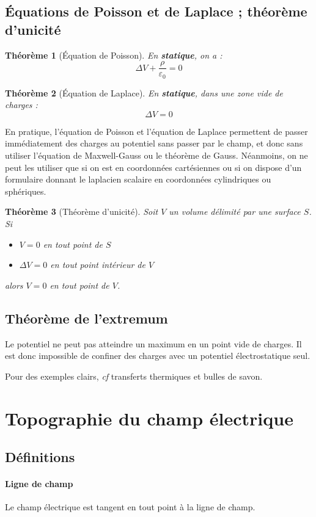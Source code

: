 \documentclass[french]{book}
\theoremstyle{plain}
\newtheorem{thm}{Théorème}
\theoremstyle{definition}
\theoremstyle{remark}
\begin{document}
\subsection{Équations de Poisson et de Laplace ; théorème d'unicité}
\begin{thm}[Équation de Poisson]
	En \textbf{statique}, on a : $$\Delta V+\frac{\rho}{\varepsilon_0}=0$$
\end{thm}
\begin{thm}[Équation de Laplace]
	En \textbf{statique}, dans une zone vide de charges : $$\Delta V=0$$
\end{thm}
En pratique, l'équation de Poisson et l'équation de Laplace permettent de passer immédiatement des charges au potentiel sans passer par le champ, et donc sans utiliser l'équation de Maxwell-Gauss ou le théorème de Gauss. Néanmoins, on ne peut les utiliser que si on est en coordonnées cartésiennes ou si on dispose d'un formulaire donnant le laplacien scalaire en coordonnées cylindriques ou sphériques.
\begin{thm}[Théorème d'unicité]
	Soit $V$ un volume délimité par une surface $S$. Si
	\begin{itemize}
		\item $V=0$ en tout point de $S$
		\item $\Delta V=0$ en tout point intérieur de $V$
	\end{itemize} alors $V=0$ en tout point de $V$.
\end{thm}
\subsection{Théorème de l'extremum}
Le potentiel ne peut pas atteindre un maximum en un point vide de charges. Il est donc impossible de confiner des charges avec un potentiel électrostatique seul. \\ \par Pour des exemples clairs, \textit{cf} transferts thermiques et bulles de savon.
\section{Topographie du champ électrique}
\subsection{Définitions}
\paragraph{Ligne de champ}Le champ électrique est tangent en tout point à la ligne de champ.
\end{document}
